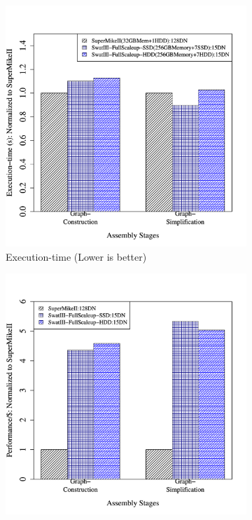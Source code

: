 \documentclass[conference]{IEEEtran}
\begin{document}
\begin{figure}[htb]
        \begin{subfigure}[b]{0.23\textwidth}
                \includegraphics[width=\textwidth]{Figure/PerormanceData/Plots/PerfDiffArchHum.pdf}
                \caption{Execution-time (Lower is better)}
                \label{fig:DifferentArchitecturesPerfHum}
        \end{subfigure}
        \begin{subfigure}[b]{0.23\textwidth}
                \includegraphics[width=\textwidth]{Figure/PerormanceData/Plots/PerfPerDollarDiffArchHum.pdf}

\end{subfigure}
\end{figure}
\end{document}
